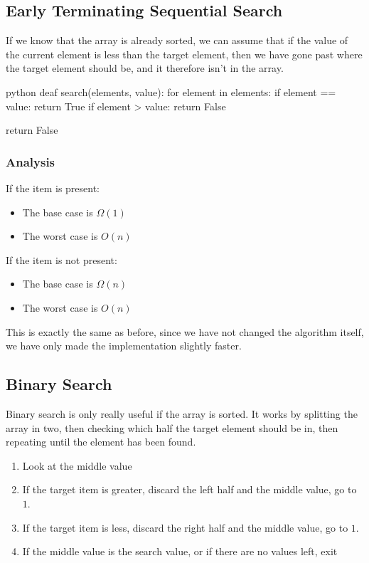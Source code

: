 \subsection{Early Terminating Sequential Search}\label{sub:early_terminating_sequential_search}

If we know that the array is already sorted, we can assume that if the value of the current element is less than the target element, then we have gone past where the target element should be, and it therefore isn't in the array.
\begin{code}{python}
    deaf search(elements, value):
        for element in elements:
            if element == value:
                return True
            if element > value:
                return False
            
        return False
\end{code}

\subsubsection{Analysis}\label{ssub:analysis_early_terminating_search}

If the item is present:
\begin{itemize}
    \item The base case is \(\Omega(1)\)
    \item The worst case is \(O(n)\)
\end{itemize}
If the item is not present:
\begin{itemize}
    \item The base case is \(\Omega(n)\)
    \item The worst case is \(O(n)\)
\end{itemize}
\begin{note}
    This is exactly the same as before, since we have not changed the algorithm itself, we have only made the implementation slightly faster.
\end{note}

\subsection{Binary Search}\label{sub:binary_search_paeleven}

Binary search is only really useful if the array is sorted.
It works by splitting the array in two, then checking which half the target element should be in, then repeating until the element has been found.
\begin{enumerate}
    \item Look at the middle value
    \item If the target item is greater, discard the left half and the middle value, go to \(1\).
    \item If the target item is less, discard the right half and the middle value, go to \(1\).
    \item If the middle value is the search value, or if there are no values left, exit
\end{enumerate}

